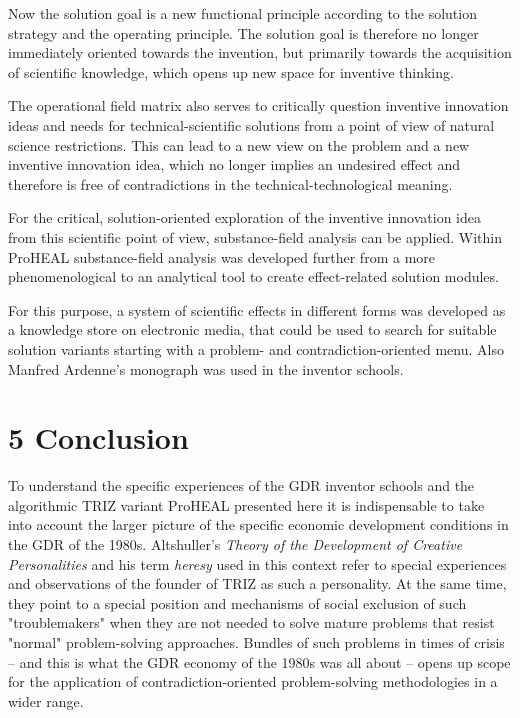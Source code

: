 \documentclass[12pt,a4paper]{article}
\begin{document}
Now the solution goal is a new functional principle according to the solution
strategy and the operating principle. The solution goal is therefore no longer
immediately oriented towards the invention, but primarily towards the
acquisition of scientific knowledge, which opens up new space for inventive
thinking.

The operational field matrix also serves to critically question inventive
innovation ideas and needs for technical-scientific solutions from a point of
view of natural science restrictions. This can lead to a new view on the
problem and a new inventive innovation idea, which no longer implies an
undesired effect and therefore is free of contradictions in the
technical-technological meaning.

For the critical, solution-oriented exploration of the inventive innovation
idea from this scientific point of view, substance-field analysis can be
applied. Within ProHEAL substance-field analysis was developed further from a
more phenomenological to an analytical tool to create effect-related solution
modules.

For this purpose, a system of scientific effects in different forms was
developed as a knowledge store on electronic media, that could be used to
search for suitable solution variants starting with a problem- and
contradiction-oriented menu. Also Manfred Ardenne’s monograph \cite{4} was
used in the inventor schools.

\section*{5 Conclusion}

To understand the specific experiences of the GDR inventor schools and the
algorithmic TRIZ variant ProHEAL presented here it is indispensable to take
into account the larger picture of the specific economic development
conditions in the GDR of the 1980s. Altshuller's \emph{Theory of the
  Development of Creative Personalities} and his term \emph{heresy} used in
this context \cite{H} refer to special experiences and observations of the
founder of TRIZ as such a personality. At the same time, they point to a
special position and mechanisms of social exclusion of such "troublemakers"
when they are not needed to solve mature problems that resist "normal"
problem-solving approaches. Bundles of such problems in times of crisis -- and
this is what the GDR economy of the 1980s was all about -- opens up scope for
the application of contradiction-oriented problem-solving methodologies in a
wider range.
\end{document}
